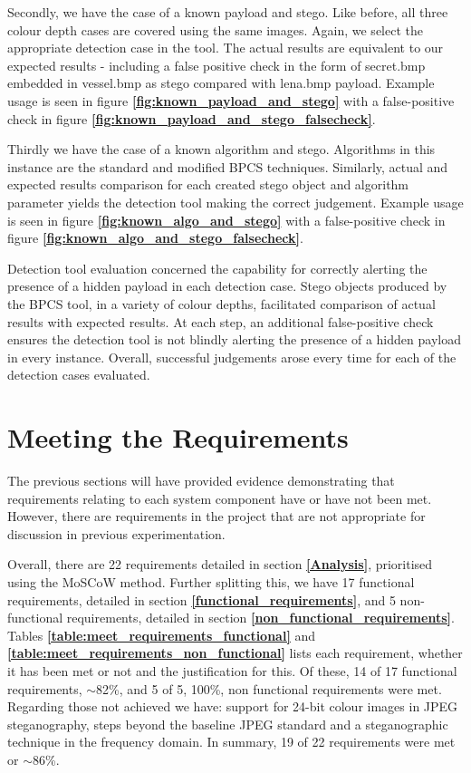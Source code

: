 \documentclass{l4proj}
\begin{document}
Secondly, we have the case of a known payload and stego. Like before, all three colour depth cases are covered using the same images. Again, we select the appropriate detection case in the tool. The actual results are equivalent to our expected results - including a false positive check in the form of secret.bmp embedded in vessel.bmp as stego compared with lena.bmp payload. Example usage is seen in figure \textbf{\ref{fig:known_payload_and_stego}} with a false-positive check in figure \textbf{\ref{fig:known_payload_and_stego_falsecheck}}.

Thirdly we have the case of a known algorithm and stego. Algorithms in this instance are the standard and modified BPCS techniques. Similarly, actual and expected results comparison for each created stego object and algorithm parameter yields the detection tool making the correct judgement. Example usage is seen in figure \textbf{\ref{fig:known_algo_and_stego}} with a false-positive check in figure \textbf{\ref{fig:known_algo_and_stego_falsecheck}}. 

Detection tool evaluation concerned the capability for correctly alerting the presence of a hidden payload in each detection case. Stego objects produced by the BPCS tool, in a variety of colour depths, facilitated comparison of actual results with expected results. At each step, an additional false-positive check ensures the detection tool is not blindly alerting the presence of a hidden payload in every instance. Overall, successful judgements arose every time for each of the detection cases evaluated.

\section{Meeting the Requirements}

The previous sections will have provided evidence demonstrating that requirements relating to each system component have or have not been met. However, there are requirements in the project that are not appropriate for discussion in previous experimentation.

Overall, there are 22 requirements detailed in section \textbf{\ref{Analysis}}, prioritised using the MoSCoW method.  Further splitting this, we have 17 functional requirements, detailed in section \textbf{\ref{functional_requirements}}, and 5 non-functional requirements, detailed in section \textbf{\ref{non_functional_requirements}}. Tables \textbf{\ref{table:meet_requirements_functional}} and \textbf{\ref{table:meet_requirements_non_functional}} lists each requirement, whether it has been met or not and the justification for this. Of these, 14 of 17 functional requirements, $\sim$82\%, and 5 of 5, 100\%, non functional requirements were met. Regarding those not achieved we have: support for 24-bit colour images in JPEG steganography, steps beyond the baseline JPEG standard and a steganographic technique in the frequency domain. In summary, 19 of 22 requirements were met or $\sim$86\%.
\end{document}
